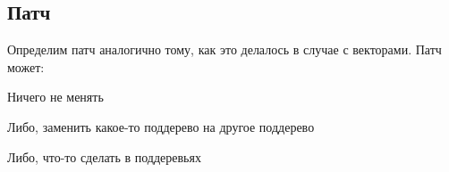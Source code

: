 \subsection{Патч}

Определим патч аналогично тому, как это делалось в случае с векторами.
Патч может:

\begin{code}%
\>  \AgdaSymbol{:}    \<%
\end{code}

Ничего не менять

\begin{code}%
\>[0]\<[2]%
\>[2] \AgdaSymbol{:}  \<%
\end{code}

Либо, заменить какое-то поддерево на другое поддерево

\begin{code}%
\>[0]\<[2]%
\>[2] \AgdaSymbol{:} \AgdaSymbol{(}  \AgdaSymbol{:} \AgdaSymbol{)}   \<%
\end{code}

Либо, что-то сделать в поддеревьях

\begin{code}%
\>[0]\<[2]%
\>[2] \AgdaSymbol{:}  \AgdaSymbol{\{}  \AgdaSymbol{:} \AgdaSymbol{\}}  \AgdaSymbol{(} \AgdaSymbol{:}  \AgdaSymbol{)} \AgdaSymbol{(} \AgdaSymbol{:}  \AgdaSymbol{)}\<%
\\
\>[2]\<[4]%
\>[4]  \AgdaSymbol{(}  \AgdaSymbol{)}\<%
\end{code}

